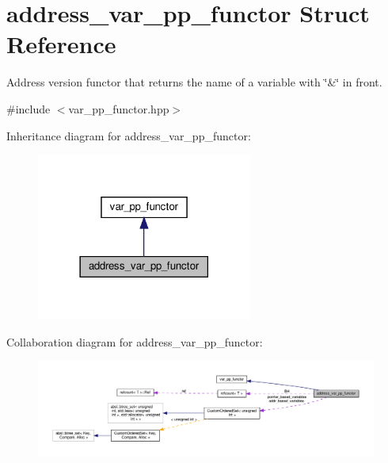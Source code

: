 \hypertarget{structaddress__var__pp__functor}{}\section{address\+\_\+var\+\_\+pp\+\_\+functor Struct Reference}
\label{structaddress__var__pp__functor}


Address version functor that returns the name of a variable with \char`\"{}\&\char`\"{} in front.  




{\ttfamily \#include $<$var\+\_\+pp\+\_\+functor.\+hpp$>$}



Inheritance diagram for address\+\_\+var\+\_\+pp\+\_\+functor\+:
\nopagebreak
\begin{figure}[H]
\begin{center}
\leavevmode
\includegraphics[width=201pt]{df/d1b/structaddress__var__pp__functor__inherit__graph}
\end{center}
\end{figure}


Collaboration diagram for address\+\_\+var\+\_\+pp\+\_\+functor\+:
\nopagebreak
\begin{figure}[H]
\begin{center}
\leavevmode
\includegraphics[width=350pt]{d9/dcd/structaddress__var__pp__functor__coll__graph}
\end{center}
\end{figure}
